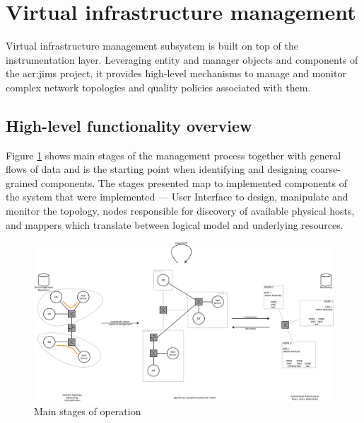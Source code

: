\documentclass[11pt,openany]{book}
\begin{document}
    \section{Virtual infrastructure management}
    \label{sec:arch:vi}

      Virtual infrastructure management subsystem is built on top of the instrumentation layer. Leveraging entity and
      manager objects and components of the \gls{acr:jims} project, it provides high-level mechanisms to manage and monitor
      complex network topologies and quality policies associated with them.


      \subsection{High-level functionality overview}
      \label{sub:arch:hl}

        Figure \ref{fig:arch:hl} shows main stages of the management process together with general flows of data and is
        the starting point when identifying and designing coarse-grained components. The stages presented map to
        implemented components of the system that were implemented --- User Interface to design, manipulate and monitor
        the topology, nodes responsible for discovery of available physical hosts, and mappers which translate between
        logical model and underlying resources.

        \begin{figure}[H]
          \begin{center}
            \includegraphics[width=\textwidth]{img/architecture/scope.pdf}
          \end{center}

          \caption{Main stages of operation}
          \label{fig:arch:hl}
        \end{figure}
\end{document}
